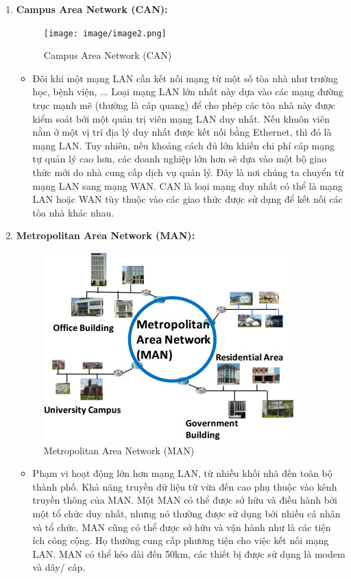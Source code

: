 \documentclass[13pt]{article}
\begin{document}
\begin{enumerate}
    \item \textbf{Campus Area Network (CAN):}  
    \begin{figure}[h!]
        \centering
        \texttt{[image: image/image2.png]}
            \caption{Campus Area Network (CAN)}
            \label{fig:label1}
    \end{figure}
    \begin{itemize}
        \item Đôi khi một mạng LAN cần kết nối mạng từ một số tòa nhà như trường học, bệnh viện, ... Loại mạng LAN lớn nhất này dựa vào các mạng đường trục mạnh mẽ (thường là cáp quang) để cho phép các tòa nhà này được kiểm soát bởi một quản trị viên mạng LAN duy nhất. Nếu khuôn viên nằm ở một vị trí địa lý duy nhất được kết nối bằng Ethernet, thì đó là mạng LAN. Tuy nhiên, nếu khoảng cách đủ lớn khiến chi phí cáp mạng tự quản lý cao hơn, các doanh nghiệp lớn hơn sẽ dựa vào một bộ giao thức mới do nhà cung cấp dịch vụ quản lý. Đây là nơi chúng ta chuyển từ mạng LAN sang mạng WAN. CAN là loại mạng duy nhất có thể là mạng LAN hoặc WAN tùy thuộc vào các giao thức được sử dụng để kết nối các tòa nhà khác nhau.
    \end{itemize}
    
    \item \textbf{Metropolitan Area Network (MAN):}
    \begin{figure}[h!]
        \centering
        \includegraphics[width=0.7\linewidth]{image/image3.png}
            \caption{Metropolitan Area Network (MAN)}
            \label{fig:label1}
    \end{figure}
    
    \begin{itemize}
        \item Phạm vi hoạt động lớn hơn mạng LAN, từ nhiều khối nhà đến toàn bộ thành phố. Khả năng truyền dữ liệu từ vừa đến cao phụ thuộc vào kênh truyền thông của MAN. Một MAN có thể được sở hữu và điều hành bởi một tổ chức duy nhất, nhưng nó thường được sử dụng bởi nhiều cá nhân và tổ chức. MAN cũng có thể được sở hữu và vận hành như là các tiện ích công cộng. Họ thường cung cấp phương tiện cho việc kết nối mạng LAN. MAN có thể kéo dài đến 50km, các thiết bị được sử dụng là modem và dây/ cáp.
    \end{itemize}


\end{enumerate}
\end{document}
